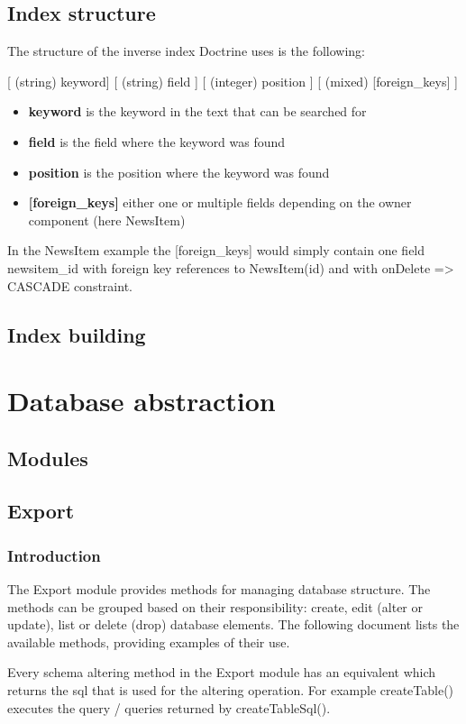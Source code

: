\documentclass[11pt,a4paper]{report}
\begin{document}
\section{Index structure}
The structure of the inverse index Doctrine uses is the following:

[ (string) keyword] [ (string) field ] [ (integer) position ] [ (mixed) [foreign\_keys] ]

\begin{itemize}
\item{\textbf{keyword} is the keyword in the text that can be searched for}
\item{\textbf{field} is the field where the keyword was found}
\item{\textbf{position} is the position where the keyword was found}
\item{\textbf{[foreign\_keys]} either one or multiple fields depending on the owner component (here NewsItem)}
\end{itemize}
In the NewsItem example the [foreign\_keys] would simply contain one field newsitem\_id with foreign key references to NewsItem(id) and with onDelete => CASCADE constraint.

\section{Index building}
\chapter{Database abstraction}
\section{Modules}
\section{Export}
\subsection{Introduction}
The Export module provides methods for managing database structure. The methods can be grouped based on their responsibility: create, edit (alter or update), list or delete (drop) database elements. The following document lists the available methods, providing examples of their use.

Every schema altering method in the Export module has an equivalent which returns the sql that is used for the altering operation. For example createTable() executes the query / queries returned by createTableSql().
\end{document}
